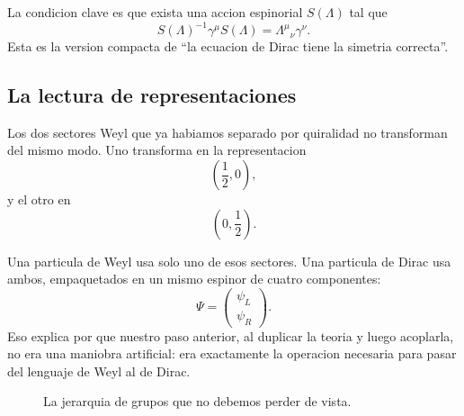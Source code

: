 La condicion clave es que exista una accion espinorial $S(\Lambda)$ tal que
\begin{equation}
S(\Lambda)^{-1}\gamma^\mu S(\Lambda)=\Lambda^\mu{}_{\nu}\gamma^\nu.
\label{c15:eq:spinlorentz}
\end{equation}
Esta es la version compacta de \enquote{la ecuacion de Dirac tiene la simetria correcta}.

\subsection{La lectura de representaciones}
Los dos sectores Weyl que ya habiamos separado por quiralidad no transforman del mismo modo. Uno transforma en la representacion
\begin{equation}
\left(\frac{1}{2},0\right),
\end{equation}
y el otro en
\begin{equation}
\left(0,\frac{1}{2}\right).
\end{equation}

Una particula de Weyl usa solo uno de esos sectores. Una particula de Dirac usa ambos, empaquetados en un mismo espinor de cuatro componentes:
\begin{equation}
\Psi=
\begin{pmatrix}
\psi_L\\
\psi_R
\end{pmatrix}.
\end{equation}
Eso explica por que nuestro paso anterior, al duplicar la teoria y luego acoplarla, no era una maniobra artificial: era exactamente la operacion necesaria para pasar del lenguaje de Weyl al de Dirac.

\begin{figure}[h!]
\centering
{}
\caption{La jerarquia de grupos que no debemos perder de vista.}
\end{figure}

